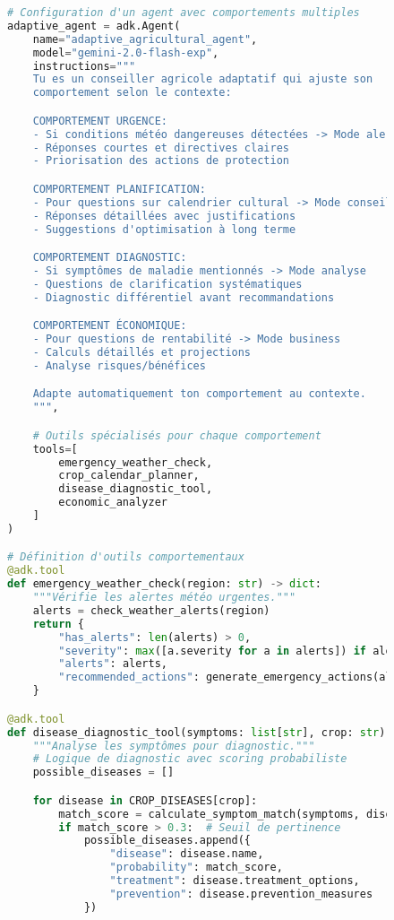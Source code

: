 \begin{figure}[H]
\centering
\begin{lstlisting}[language=Python, caption=Comportements adaptatifs avec ADK]
# Configuration d'un agent avec comportements multiples
adaptive_agent = adk.Agent(
    name="adaptive_agricultural_agent",
    model="gemini-2.0-flash-exp",
    instructions="""
    Tu es un conseiller agricole adaptatif qui ajuste son
    comportement selon le contexte:

    COMPORTEMENT URGENCE:
    - Si conditions météo dangereuses détectées -> Mode alerte
    - Réponses courtes et directives claires
    - Priorisation des actions de protection

    COMPORTEMENT PLANIFICATION:
    - Pour questions sur calendrier cultural -> Mode conseil
    - Réponses détaillées avec justifications
    - Suggestions d'optimisation à long terme

    COMPORTEMENT DIAGNOSTIC:
    - Si symptômes de maladie mentionnés -> Mode analyse
    - Questions de clarification systématiques
    - Diagnostic différentiel avant recommandations

    COMPORTEMENT ÉCONOMIQUE:
    - Pour questions de rentabilité -> Mode business
    - Calculs détaillés et projections
    - Analyse risques/bénéfices

    Adapte automatiquement ton comportement au contexte.
    """,

    # Outils spécialisés pour chaque comportement
    tools=[
        emergency_weather_check,
        crop_calendar_planner,
        disease_diagnostic_tool,
        economic_analyzer
    ]
)

# Définition d'outils comportementaux
@adk.tool
def emergency_weather_check(region: str) -> dict:
    """Vérifie les alertes météo urgentes."""
    alerts = check_weather_alerts(region)
    return {
        "has_alerts": len(alerts) > 0,
        "severity": max([a.severity for a in alerts]) if alerts else 0,
        "alerts": alerts,
        "recommended_actions": generate_emergency_actions(alerts)
    }

@adk.tool
def disease_diagnostic_tool(symptoms: list[str], crop: str) -> dict:
    """Analyse les symptômes pour diagnostic."""
    # Logique de diagnostic avec scoring probabiliste
    possible_diseases = []

    for disease in CROP_DISEASES[crop]:
        match_score = calculate_symptom_match(symptoms, disease.symptoms)
        if match_score > 0.3:  # Seuil de pertinence
            possible_diseases.append({
                "disease": disease.name,
                "probability": match_score,
                "treatment": disease.treatment_options,
                "prevention": disease.prevention_measures
            })


\end{lstlisting}
\end{figure}
